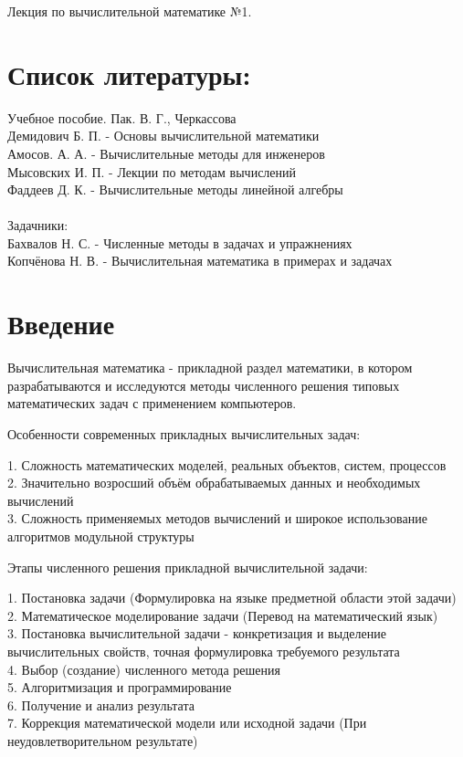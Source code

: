\documentclass[a4paper]{article}
\begin{document}
\begin{center}
	Лекция по вычислительной математике №1.
\end{center}
\section*{Список литературы:}
Учебное пособие. Пак. В. Г., Черкассова\\
Демидович Б. П. - Основы вычислительной математики\\
Амосов. А. А. - Вычислительные методы для инженеров\\
Мысовских И. П. - Лекции по методам вычислений\\
Фаддеев Д. К. - Вычислительные методы линейной алгебры\\\\
Задачники:\\
Бахвалов Н. С. - Численные методы в задачах и упражнениях\\
Копчёнова Н. В. - Вычислительная математика в примерах и задачах\\
\newpage

\section*{Введение}

Вычислительная математика - прикладной раздел математики, в котором разрабатываются и исследуются методы численного решения типовых математических задач с применением компьютеров.\\
\begin{center}
Особенности современных прикладных вычислительных задач:\\
\end {center}
1. Сложность математических моделей, реальных объектов, систем, процессов\\
2. Значительно возросший объём обрабатываемых данных и необходимых вычислений\\
3. Сложность применяемых методов вычислений и широкое использование алгоритмов модульной структуры\\
\begin{center}
	Этапы численного решения прикладной вычислительной задачи:
\end{center}
1. Постановка задачи (Формулировка на языке предметной области этой задачи)\\
2. Математическое моделирование задачи (Перевод на математический язык)\\
3. Постановка вычислительной задачи - конкретизация и выделение вычислительных свойств, точная формулировка требуемого результата\\
4. Выбор (создание) численного метода решения\\
5. Алгоритмизация и программирование\\
6. Получение и анализ результата\\
7. Коррекция математической модели или исходной задачи (При неудовлетворительном результате)\\ 
\newpage
\end{document}
